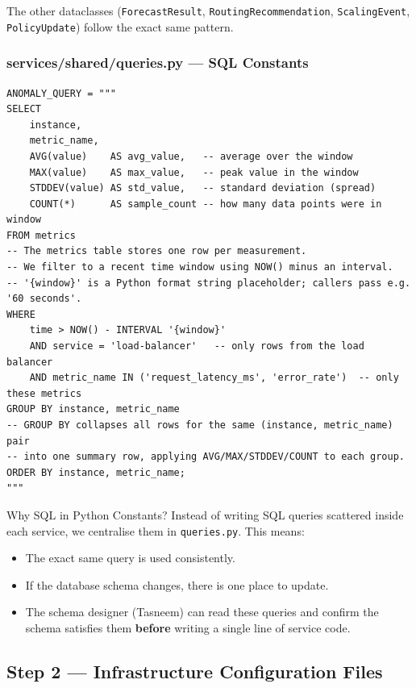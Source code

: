 \documentclass[12pt, a4paper]{article}
\begin{document}
The other dataclasses (\texttt{ForecastResult}, \texttt{RoutingRecommendation},
\texttt{ScalingEvent}, \texttt{PolicyUpdate}) follow the exact same pattern.

\subsubsection{services/shared/queries.py --- SQL Constants}

\begin{lstlisting}[style=python, caption={services/shared/queries.py --- the anomaly query}]
ANOMALY_QUERY = """
SELECT
    instance,
    metric_name,
    AVG(value)    AS avg_value,   -- average over the window
    MAX(value)    AS max_value,   -- peak value in the window
    STDDEV(value) AS std_value,   -- standard deviation (spread)
    COUNT(*)      AS sample_count -- how many data points were in window
FROM metrics
-- The metrics table stores one row per measurement.
-- We filter to a recent time window using NOW() minus an interval.
-- '{window}' is a Python format string placeholder; callers pass e.g. '60 seconds'.
WHERE
    time > NOW() - INTERVAL '{window}'
    AND service = 'load-balancer'   -- only rows from the load balancer
    AND metric_name IN ('request_latency_ms', 'error_rate')  -- only these metrics
GROUP BY instance, metric_name
-- GROUP BY collapses all rows for the same (instance, metric_name) pair
-- into one summary row, applying AVG/MAX/STDDEV/COUNT to each group.
ORDER BY instance, metric_name;
"""
\end{lstlisting}

\begin{importantbox}{Why SQL in Python Constants?}
Instead of writing SQL queries scattered inside each service, we centralise
them in \texttt{queries.py}. This means:
\begin{itemize}
  \item The exact same query is used consistently.
  \item If the database schema changes, there is one place to update.
  \item The schema designer (Tasneem) can read these queries and confirm the
        schema satisfies them \textbf{before} writing a single line of service code.
\end{itemize}
\end{importantbox}

\subsection{Step 2 --- Infrastructure Configuration Files}
\label{sec:infra}
\end{document}

